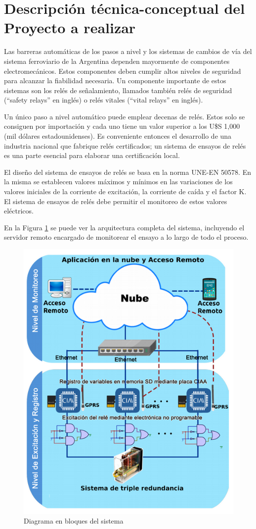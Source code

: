 \documentclass[11pt]{charter}
\begin{document}
\section{Descripción técnica-conceptual del Proyecto a realizar}
\label{sec:descripcion}

Las barreras automáticas de los pasos a nivel y los sistemas de cambios de vía del sistema ferroviario de la Argentina dependen mayormente de componentes  electromecánicos. Estos componentes deben cumplir altos niveles de seguridad para alcanzar la fiabilidad necesaria. Un componente importante de estos sistemas son los relés de señalamiento, llamados también relés de seguridad (“safety relays” en inglés) o relés vitales (“vital relays” en inglés).

Un único paso a nivel automático puede emplear decenas de relés. Estos solo se consiguen por importación y cada uno tiene un valor superior a los U\$S 1,000 (mil dólares estadounidenses). Es conveniente entonces el desarrollo de una industria nacional que fabrique relés certificados; un sistema de ensayos de relés es una parte esencial para elaborar una certificación local.

El diseño del sistema de ensayos de relés se basa en la norma UNE-EN 50578. En la misma se establecen valores máximos y mínimos en las variaciones de los valores iniciales de la corriente de excitación, la corriente de caída y el factor K. El sistema de ensayos de relés debe permitir el monitoreo de estos valores eléctricos.

En la Figura \ref{fig:diagBloques2} se puede ver la arquitectura completa del sistema, incluyendo el servidor remoto encargado de monitorear el ensayo a lo largo de todo el proceso.

\vspace{25px}

\begin{figure}[H]
\centering 
\includegraphics[width=.6\textwidth]{./Figuras/bloques.png}
\caption{Diagrama en bloques del sistema}
\label{fig:diagBloques2}
\end{figure}
\end{document}
